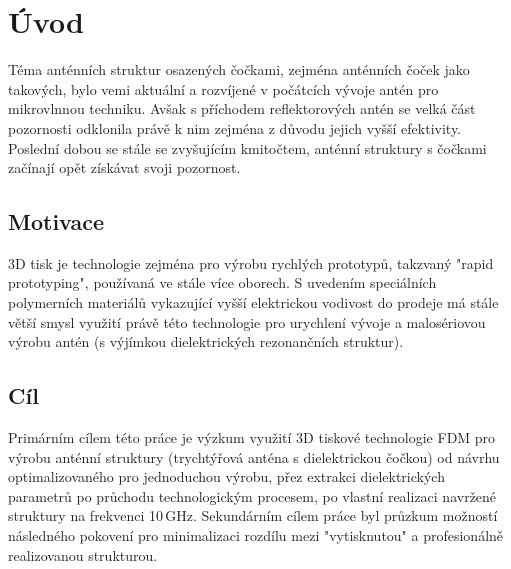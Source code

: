 \chapter{Úvod}
Téma anténních struktur osazených čočkami, zejména anténních čoček jako takových, bylo vemi aktuální a rozvíjené v počátcích vývoje antén pro mikrovlnnou techniku. Avšak s příchodem reflektorových antén se velká část pozornosti odklonila právě k nim zejména z důvodu jejich vyšší efektivity. Poslední dobou se stále se zvyšujícím kmitočtem, anténní struktury s čočkami začínají opět získávat svoji pozornost. \cite{ModernLens}

\section{Motivace}
3D tisk je technologie zejména pro výrobu rychlých prototypů, takzvaný "rapid prototyping", používaná ve stále více oborech. S uvedením speciálních polymerních materiálů vykazující vyšší elektrickou vodivost do prodeje má stále větší smysl využití právě této technologie pro urychlení vývoje a malosériovou výrobu antén (s výjímkou dielektrických rezonančních struktur).

\section{Cíl}
Primárním cílem této práce je výzkum využití 3D tiskové technologie FDM pro výrobu anténní struktury (trychtýřová anténa s dielektrickou čočkou) od návrhu optimalizovaného pro jednoduchou výrobu, přez extrakci dielektrických parametrů po průchodu technologickým procesem, po vlastní realizaci navržené struktury na frekvenci 10\,GHz. Sekundárním cílem práce byl průzkum možností následného pokovení pro minimalizaci rozdílu mezi "vytisknutou" a profesionálně realizovanou strukturou.